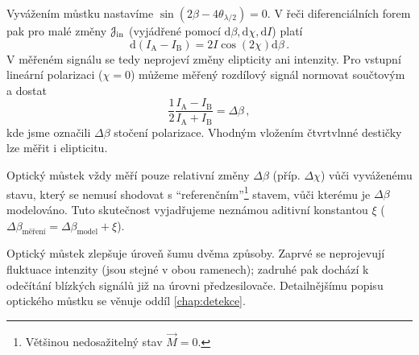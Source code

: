 Vyvážením můstku nastavíme $\sin(2\beta-4\theta_{\lambda/2})=0$. 
V řeči diferenciálních forem pak pro malé změny $\mathcal{J}_\textrm{in}$ (vyjádřené pomocí $\textrm{d}\beta, \textrm{d}\chi, \textrm{d}I$) platí
\begin{equation}
\label{eqn:A-B-mustek}
    \textrm{d}(I_\textrm{A}-I_\textrm{B})=2I\cos(2\chi) \textrm{d}\beta \,.
\end{equation}
V měřeném signálu se tedy neprojeví změny elipticity ani intenzity.
Pro vstupní lineární polarizaci ($\chi=0$) můžeme měřený rozdílový signál normovat součtovým a dostat
\begin{equation}
\label{eqn:mustek-delta-beta}
    \frac{1}{2}\frac{I_\textrm{A}-I_\textrm{B}}{I_\textrm{A}+I_\textrm{B}}=\Delta\beta \,,
\end{equation}
kde jsme označili $\Delta\beta$ stočení polarizace.
Vhodným vložením čtvrtvlnné destičky lze měřit i elipticitu\cite{silberQuadraticMagnetoopticKerr2019a}.

Optický můstek vždy měří pouze relativní změny $\Delta\beta$ (příp. $\Delta\chi$) vůči vyváženému stavu, který se nemusí shodovat s ``referenčním''\footnote{Většinou nedosažitelný stav $\vec{M}=0$.} stavem, vůči kterému je $\Delta\beta$ modelováno.
Tuto skutečnost vyjadřujeme neznámou aditivní konstantou $\xi$ ($\Delta\beta_\textrm{měření}=\Delta\beta_\textrm{model}+\xi$).

Optický můstek zlepšuje úroveň šumu dvěma způsoby.
Zaprvé se neprojevují fluktuace intenzity (jsou stejné v obou ramenech); zadruhé pak dochází k odečítání blízkých signálů již na úrovni předzesilovače.
Detailnějšímu popisu optického můstku se věnuje oddíl \ref{chap:detekce}.

